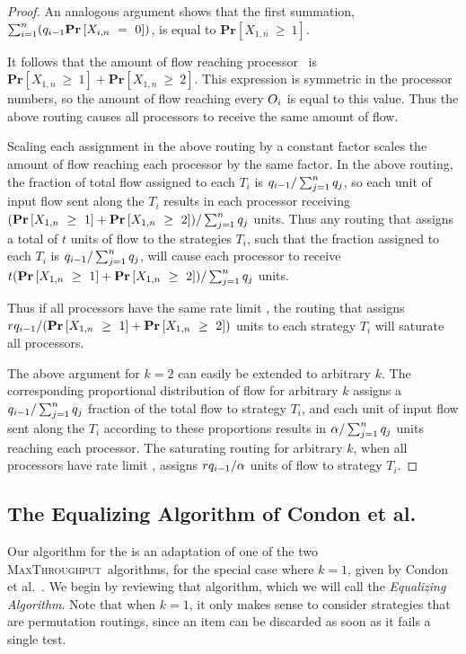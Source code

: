 \documentclass{article}
\newcounter{ass}
\newcommand{\ens}[1]{\ensuremath{#1}}					\newcommand{\card}[1]{\ens{|#1|}}							\newcommand{\dotlist}[2]{\ens{#1,\ldots,#2}}
\newcommand{\valn}{\ens{n}}
\newcommand{\valk}{\ens{k}}
\newcommand{\maxthru}{\textsc{MaxThroughput}}
\newcommand{\processor}{processor}
\newcommand{\probgen}[1]{\ens{\mathbf{Pr}\left[#1\right]}}
\newcommand{\hitsum}[2]{\ens{X_{#1,#2}}}					\newcommand{\probeq}[3]{\probgen{\hitsum{#1}{#2}~=~#3}}
\newcommand{\probge}[3]{\probgen{\hitsum{#1}{#2}~\geq~#3}}
\begin{document}
\begin{proof}
An analogous argument shows that the first summation,
$\sum_{i=1}^n (\qr{i-1}\probeq i \valn 0)$,
is equal to 
$\probge 1\valn 1$.


It follows that the amount of flow reaching \processor\  is
$\probge 1\valn 1 + \probge 1\valn 2$. 
This expression is symmetric in the {\processor} numbers, so the
amount of flow reaching every $\op i$ is equal to this value.
Thus the above routing causes all {\processor}s to receive the same amount of flow.

Scaling each assignment in the above routing by a constant
factor scales the amount of flow reaching each
{\processor} by the same factor.
In the above routing, the fraction of total flow assigned to each
$T_i$ is 
$\qr{i-1}/\sum_{j=1}^n \qr{j}$, so
each unit of input flow sent along the $T_i$ 
results in each processor receiving
$(\probge 1\valn 1 + \probge 1\valn 2)
/\sum_{j=1}^n \qr{j}$ units.
Thus any routing that assigns a total of $t$
units of flow to the strategies $T_i$, such
that the fraction assigned to each $T_i$ is 
$\qr{i-1}/\sum_{j=1}^n \qr{j}$,
will cause each processor to receive 
$t(\probge 1\valn 1 + \probge 1\valn 2)
/\sum_{j=1}^n \qr{j}$ units.

Thus if
all {\processor}s
have the same rate limit \commonr,  
the routing that assigns $\commonr\qr{i-1}/(\probge 1\valn 1 +  \probge 1\valn 2)$
units to each strategy $T_i$ will saturate all {\processor}s. 

The above argument for $\valk = 2$ can easily be extended to arbitrary $\valk$.
The corresponding
proportional distribution of flow for arbitrary $\valk$ assigns
a $\qr{i-1}/\sum_{j=1}^n \qr{j}$ fraction of the total flow
to strategy $T_i$, and
each unit of input flow sent along the $T_i$ according to
these proportions results in $\alpha/\sum_{j=1}^n \qr{j}$ units
reaching each {\processor}.
The saturating routing
for arbitrary $\valk$, when all {\processor}s have rate limit \commonr, assigns
$r\qr{i-1}/\alpha$ units of flow
to strategy $T_i$.
 \end{proof}


\subsection{The Equalizing Algorithm of Condon et al.}

Our algorithm for the \cmt{} is an adaptation of
one of the two \maxthru\ algorithms, for the special case where $\valk=1$,
given by Condon et al.~\cite{journals/talg/CondonDHW09}.
We begin by reviewing
that algorithm, which we will call the {\em Equalizing Algorithm}.
Note that when $\valk=1$, it only makes sense to consider strategies
that are permutation routings, since an item can be discarded as
soon as it fails a single test.
\end{document}
